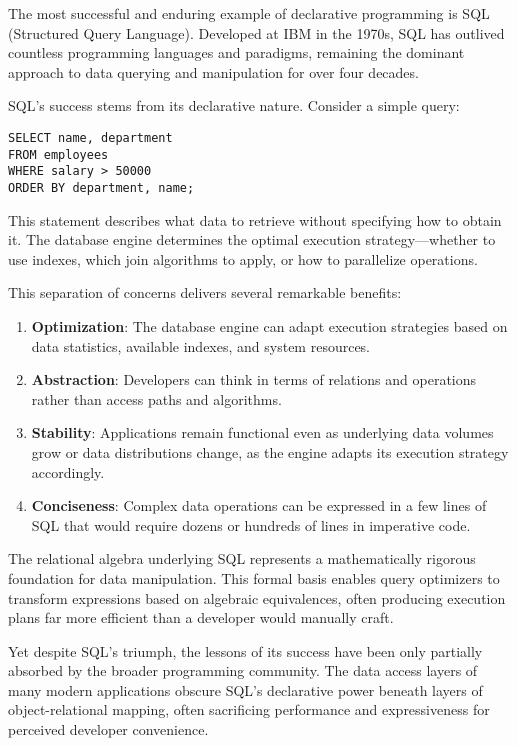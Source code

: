 \documentclass[11pt]{article}
\begin{document}
The most successful and enduring example of declarative programming is SQL (Structured Query Language). Developed at IBM in the 1970s, SQL has outlived countless programming languages and paradigms, remaining the dominant approach to data querying and manipulation for over four decades.

SQL's success stems from its declarative nature. Consider a simple query:

\begin{verbatim}
SELECT name, department
FROM employees
WHERE salary > 50000
ORDER BY department, name;
\end{verbatim}

This statement describes what data to retrieve without specifying how to obtain it. The database engine determines the optimal execution strategy—whether to use indexes, which join algorithms to apply, or how to parallelize operations.

This separation of concerns delivers several remarkable benefits:

\begin{enumerate}
\item \textbf{Optimization}: The database engine can adapt execution strategies based on data statistics, available indexes, and system resources.

\item \textbf{Abstraction}: Developers can think in terms of relations and operations rather than access paths and algorithms.

\item \textbf{Stability}: Applications remain functional even as underlying data volumes grow or data distributions change, as the engine adapts its execution strategy accordingly.

\item \textbf{Conciseness}: Complex data operations can be expressed in a few lines of SQL that would require dozens or hundreds of lines in imperative code.
\end{enumerate}

The relational algebra underlying SQL represents a mathematically rigorous foundation for data manipulation. This formal basis enables query optimizers to transform expressions based on algebraic equivalences, often producing execution plans far more efficient than a developer would manually craft.

Yet despite SQL's triumph, the lessons of its success have been only partially absorbed by the broader programming community. The data access layers of many modern applications obscure SQL's declarative power beneath layers of object-relational mapping, often sacrificing performance and expressiveness for perceived developer convenience.
\end{document}
